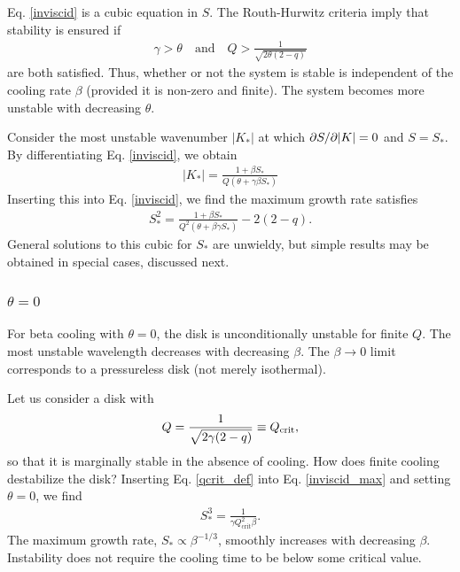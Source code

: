 Eq. \ref{inviscid} is a cubic equation in $S$. The 
Routh-Hurwitz criteria imply that stability is ensured if 
\begin{align}\label{stable_condition}
  \gamma > \theta \quad \text{and} \quad 
  Q > \frac{1}{\sqrt{2\theta(2-q)}} 
\end{align}
are both satisfied. Thus, whether or not the system is stable is
independent of the cooling rate $\beta$ (provided it is non-zero and
finite). The system becomes more unstable with decreasing $\theta$.   

Consider the most unstable wavenumber $|K_*|$ at which $\partial S/\partial |K| =
0$ and $S = 
S_*$. By differentiating Eq. \ref{inviscid}, we obtain 
\begin{align}\label{kstar}
  |K_*| = \frac{1+\beta S_*}{Q\left(\theta + \gamma \beta S_*\right)}
\end{align}
Inserting this into Eq. \ref{inviscid}, we find the maximum growth
rate satisfies
\begin{align}\label{inviscid_max}
  S_*^2 = \frac{1+\beta S_*}{Q^2\left(\theta + \beta\gamma S_*\right)}
  - 2(2-q).
\end{align}
General solutions to this cubic for $S_*$ are unwieldy, but simple
results may be obtained in special cases, discussed next. 


\subsubsection{$\theta = 0$}  
For beta cooling with $\theta=0$, the disk is unconditionally
unstable for finite $Q$. The most unstable wavelength decreases with
decreasing $\beta$. The $\beta\to0$ limit corresponds to a
pressureless disk (not merely isothermal).   


Let us consider a disk with 
\begin{align}\label{qcrit_def}
  Q = \frac{1}{\sqrt{2\gamma(2-q)}}\equiv Q_{\mathrm{crit}},
\end{align} 
so that it is marginally stable in the absence of cooling.  
How does finite cooling destabilize the disk?  
Inserting Eq. \ref{qcrit_def} into Eq. \ref{inviscid_max} and setting
$\theta=0$, we find 
\begin{align}\label{sstar}
  S_*^3 = \frac{1}{\gamma Q_\mathrm{crit}^2 \beta}. 
\end{align}
The maximum growth rate, $S_*\propto \beta^{-1/3}$, smoothly
increases with decreasing $\beta$. Instability does not require the
cooling time to be below some critical value. 


